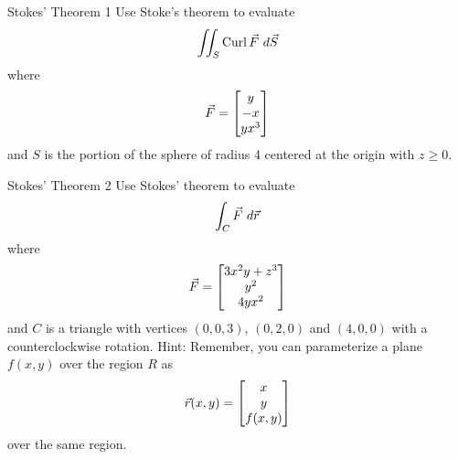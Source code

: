 \begin{pexercise}{Stokes' Theorem 1}
Use Stoke's theorem to evaluate $$\iint_S \operatorname{Curl}\vec{F} \ d\vec{S} $$ where $$\vec{F}=\begin{bmatrix}y\\-x\\yx^3\end{bmatrix} $$ and $S$ is the portion of the sphere of radius 4 centered at the origin with $z\geq 0$.
\end{pexercise}

\begin{pexercise}{Stokes' Theorem 2}
Use Stokes' theorem to evaluate $$\int_C \vec{F}\ d\vec{r} $$ where $$\vec{F}=\begin{bmatrix}3x^2y+z^3\\y^2\\4yx^2\end{bmatrix}$$ and $C$ is a triangle with vertices $(0,0,3)$, $(0,2,0)$ and $(4,0,0)$ with a counterclockwise rotation. Hint: Remember, you can parameterize a plane $f(x,y)$ over the region $R$ as $$\vec{r}(x,y)=\begin{bmatrix}x\\y\\f(x,y)\end{bmatrix}$$ over the same region.
\end{pexercise}

\renewcommand\thesubsection{\thesection.\arabic{subsection}}